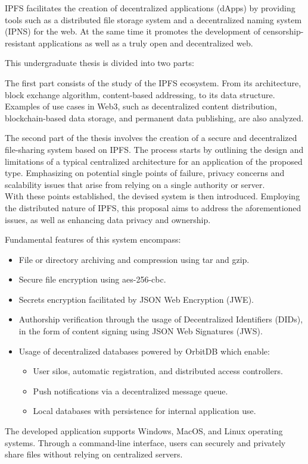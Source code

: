 IPFS facilitates the creation of decentralized applications (dApps) by providing tools such as a distributed file storage system and a decentralized naming system (IPNS) for the web. At the same time it promotes the development of censorship-resistant applications as well as a truly open and decentralized web.

This undergraduate thesis is divided into two parts:

The first part consists of the study of the IPFS ecosystem. From its architecture, block exchange algorithm, content-based addressing, to its data structure. Examples of use cases in Web3, such as decentralized content distribution, blockchain-based data storage, and permanent data publishing, are also analyzed.

The second part of the thesis involves the creation of a secure and decentralized file-sharing system based on IPFS.
The process starts by outlining the design and limitations of a typical centralized architecture for an application of the proposed type. Emphasizing on potential single points of failure, privacy concerns and scalability issues that arise from relying on a single authority or server.
\\With these points established, the devised system is then introduced. Employing the distributed nature of IPFS, this proposal aims to address the aforementioned issues, as well as enhancing data privacy and ownership.

Fundamental features of this system encompass:

\begin{itemize}[itemsep=1pt,nolistsep]
    \item File or directory archiving and compression using tar and gzip.
    \item Secure file encryption using aes-256-cbc.
    \item Secrets encryption facilitated by JSON Web Encryption (JWE).
    \item Authorship verification through the usage of Decentralized Identifiers (DIDs), in the form of content signing using JSON Web Signatures (JWS).
    \item Usage of decentralized databases powered by OrbitDB which enable:
          \begin{itemize}
              \item User silos, automatic registration, and distributed access controllers.
              \item Push notifications via a decentralized message queue.
              \item Local databases with persistence for internal application use.
          \end{itemize}
\end{itemize}


The developed application supports Windows, MacOS, and Linux operating systems. Through a command-line interface, users can securely and privately share files without relying on centralized servers.